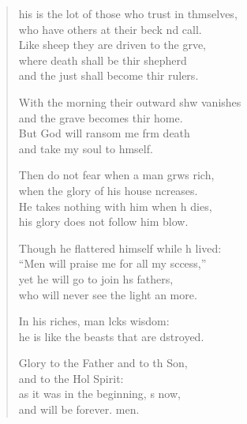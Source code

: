 \begin{verse}
  \begin{patverse}
his is the lot of those who trust in thmselves,\Med\\
who have others at their beck nd call.\\
Like sheep they are driven to the grve,\Flex\\
where death shall be thir shepherd\Med\\
and the just shall become thir rulers.

With the morning their outward shw vanishes\Med\\
and the grave becomes thir home.\\
But God will ransom me frm death\Med\\
and take my soul to h\pointup{\i}mself.

Then do not fear when a man grws rich,\Med\\
when the glory of his house \pointup{\i}ncreases.\\
He takes nothing with him when h dies,\Med\\
his glory does not follow him blow.

Though he flattered himself while h lived:\Med\\
“Men will praise me for all my sccess,”\\
yet he will go to join h\pointup{\i}s fathers,\Med\\
who will never see the light an more.

In his riches, man lcks wisdom:\Med\\
he is like the beasts that are dstroyed.

Glory to the Father and to th Son,\Med\\
and to the Hol Spirit:\\
as it was in the beginning, \pointup{\i}s now,\Med\\
and will be forever. men. 
  \end{patverse}
\end{verse}
